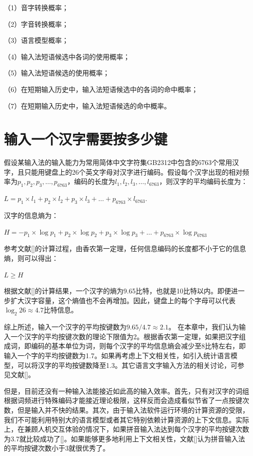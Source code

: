 （1）音字转换概率；

（2）字音转换概率；

（3）语言模型概率；

（4）输入法短语候选中各词的使用概率；

（5）输入法短语候选的使用概率；

（6）在短期输入历史中，输入法短语候选中的各词的命中概率；

（7）在短期输入历史中，输入法短语候选的命中概率。

\section{输入一个汉字需要按多少键}

假设某输入法的输入能力为常用简体中文字符集GB2312中包含的6763个常用汉字，且只能用键盘上的26个英文字母对汉字进行编码。假设每个汉字出现的相对频率为$p_1,p_2,p_3,\ldots,p_{6763}$，编码的长度为$l_1,l_2,l_3,\ldots,l_{6763}$，则汉字的平均编码长度为：

$L = p_1 \times l_1 + p_2 \times l_2 + p_3 \times l_3 + \ldots + p_{6763} \times l_{6763}$.

汉字的信息熵为：

$H = -p_1 \times \log p_1 + p_2 \times \log p_2 + p_3 \times \log p_3  + \ldots + p_{6763} \times \log p_{6763}$

参考文献[\cite{wujun:2012}]的计算过程，由香农第一定理，任何信息编码的长度都不小于它的信息熵，则可以得出：

$L \ge H$

根据文献[\cite{feng:1984}]的计算结果，一个汉字的熵为9.65比特，也就是10比特以内。即便进一步扩大汉字容量，这个熵值也不会再增加。因此，键盘上的每个字母可以代表$\log_2 26 \approx 4.7$比特信息。

综上所述，输入一个汉字的平均按键数为$9.65/4.7 \approx 2.1$。
在本章中，我们认为输入一个汉字的平均按键次数的理论下限值为2。根据香农第一定理，如果把汉字组成词，即编码的基本单位为词，则每个汉字的平均信息熵会减少至8比特左右，即输入一个字的平均按键数为1.7。如果再考虑上下文相关性，如引入统计语言模型，可以将汉字的平均按键数降至1.3。其它语言文字输入方法的相关讨论，可参见文献[\cite{Garay-Vitoria:2006}]。

但是，目前还没有一种输入法能接近如此高的输入效率。首先，只有对汉字的词组根据词频进行特殊编码才能接近理论极限，这样反而会造成看似节省了一点按键次数，但是输入并不快的结果。其次，由于输入法软件运行环境的计算资源的受限，我们不可能利用特别大的语言模型或者其它特别依赖计算资源的上下文信息。实际上，在兼顾人机交互体验的情况下，如果拼音输入法达到每个汉字的平均按键次数为3.7就比较成功了[\cite{Cui:1985}]。如果能够更多地利用上下文相关性，文献[\cite{wujun:2012}]认为拼音输入法的平均按键次数小于3就很优秀了。

